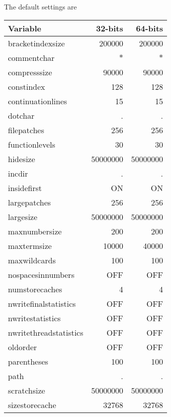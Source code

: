 The default settings are
\begin{center}
\begin{tabular}{lrr}
Variable         &      32-bits       &    64-bits   \\ \hline
bracketindexsize &      200000        & 200000 \\
commentchar &           $*$           & $*$ \\
compresssize &          90000         & 90000 \\
constindex &            128           & 128 \\
continuationlines &     15            & 15 \\
dotchar &               .             & . \\
filepatches &           256           & 256 \\
functionlevels &        30            & 30 \\
hidesize &              50000000      & 50000000 \\
incdir &                .             & . \\
insidefirst &           ON            & ON \\
largepatches &          256           & 256 \\
largesize &             50000000      & 50000000 \\
maxnumbersize &         200           & 200 \\
maxtermsize &           10000         & 40000 \\
maxwildcards &          100           & 100 \\
nospacesinnumbers &     OFF           & OFF \\
numstorecaches &        4             & 4 \\
nwritefinalstatistics & OFF           & OFF \\
nwritestatistics &      OFF           & OFF \\
nwritethreadstatistics &OFF           & OFF \\
oldorder &              OFF           & OFF \\
parentheses &           100           & 100 \\
path &                  .             & . \\
scratchsize &           50000000      & 50000000 \\
sizestorecache &        32768         & 32768 \\

\end{tabular}
\end{center}
